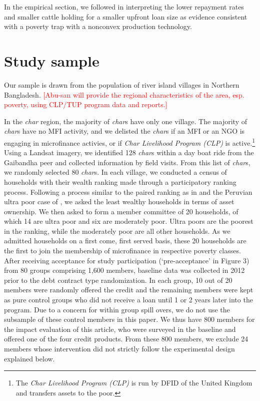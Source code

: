 	In the empirical section, we followed \citet{BandieraBRAC2017} in interpreting the lower repayment rates and smaller cattle holding for a smaller upfront loan size as evidence consistent with a poverty trap with a nonconvex production technology. 

\section{Study sample}
\label{SecStudySample}

	Our sample is drawn from the population of river island villages in Northern Bangladesh. 
	\textcolor{red}{[Abu-san will provide the regional characteristics of the area, esp. poverty, using CLP/TUP program data and reports.]}
	
	In the \textit{char} region, the majority of \textit{char}s have only one village. The majority of \textit{char}s have no MFI activity, and we delisted the \textit{char}s if an MFI or an NGO is engaging in microfinance activies, or if \textit{Char Livelihood Program (CLP)} is active.\footnote{The \textit{Char Livelihood Program (CLP)} is run by DFID of the United Kingdom and transfers assets to the poor. } Using a Landsat imagery, we identified 128 \textit{char}s within a day boat ride from the Gaibandha peer and collected information by field visits. From this list of \textit{char}s, we randomly selected 80 \textit{char}s. In each village, we conducted a census of households with their wealth ranking made through a participatory ranking process. Following a process similar to the paired ranking as in \citet[][p.1212]{Alatas2012} and the Peruvian ultra poor case of \citet[][p.66]{KarlanThuysbaert2019}, we asked the least wealthy households in terms of asset ownership. We then asked to form a member committee of 20 households, of which 14 are ultra poor and six are moderately poor. Ultra poors are the poorest in the ranking, while the moderately poor are all other households. As we admitted households on a first come, first served basis, these 20 households are the first to join the membership of microfinance in respective poverty classes. After receiving acceptance for study participation (‘pre-acceptance’ in Figure 3) from 80 groups comprising 1,600 members, baseline data was collected in 2012 prior to the debt contract type randomization. In each group, 10 out of 20 members were randomly offered the credit and the remaining members were kept as pure control groups who did not receive a loan until 1 or 2 years later into the program. Due to a concern for within group spill overs, we do not use the subsample of these control members in this paper. We thus have 800 members for the impact evaluation of this article, who were surveyed in the baseline and offered one of the four credit products. From these 800 members, we exclude 24 members whose intervention did not strictly follow the experimental design explained below.
	
